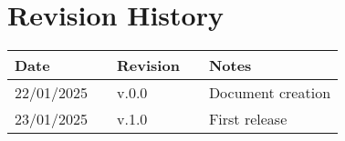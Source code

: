 \chapter*{Revision History}

\begin{table}[h]
    \centering
    \begin{tabular}{l p{2.5cm} l p{2.5cm} l}
        \hline
        \textbf{Date} &  & \textbf{Revision} &  & \textbf{Notes}    \\ \hline
        22/01/2025    &  & v.0.0             &  & Document creation \\
        23/01/2025    &  & v.1.0             &  & First release     \\\hline
    \end{tabular}
\end{table}

\newpage